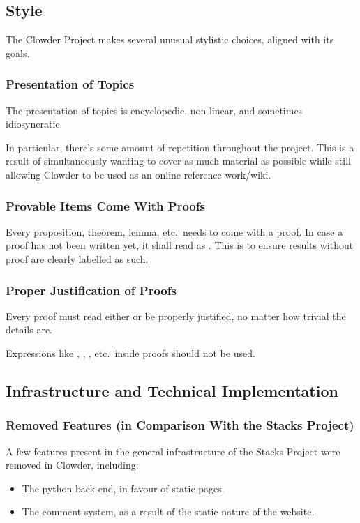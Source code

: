 \subsection{Style}\label{subsection-style}
The Clowder Project makes several unusual stylistic choices, aligned with its goals.
\subsubsection{Presentation of Topics}\label{subsubsection-presentation-of-topics}
The presentation of topics is encyclopedic, non-linear, and sometimes idiosyncratic.

In particular, there's some amount of repetition throughout the project. This is a result of simultaneously wanting to cover as much material as possible while still allowing Clowder to be used as an online reference work/wiki.
\subsubsection{Provable Items Come With Proofs}\label{subsubsection-provable-items-come-with-proofs}
Every proposition, theorem, lemma, etc.\ needs to come with a proof. In case a proof has not been written yet, it shall read as . This is to ensure results without proof are clearly labelled as such.
\subsubsection{Proper Justification of Proofs}\label{subsubsection-proper-justification-of-proofs}
Every proof must read either  or be properly justified, no matter how trivial the details are.

Expressions like , , , etc.\ inside proofs should not be used.
\subsection{Infrastructure and Technical Implementation}\label{subsection-infrastructure-and-technical-implementation}
\subsubsection{Removed Features (in Comparison With the Stacks Project)}\label{subsubsection-removed-features-in-comparison-with-the-stacks-project}
A few features present in the general infrastructure of the Stacks Project were removed in Clowder, including:
\begin{itemize}
    \item The python back-end, in favour of static pages.
    \item The comment system, as a result of the static nature of the website.
\end{itemize}
